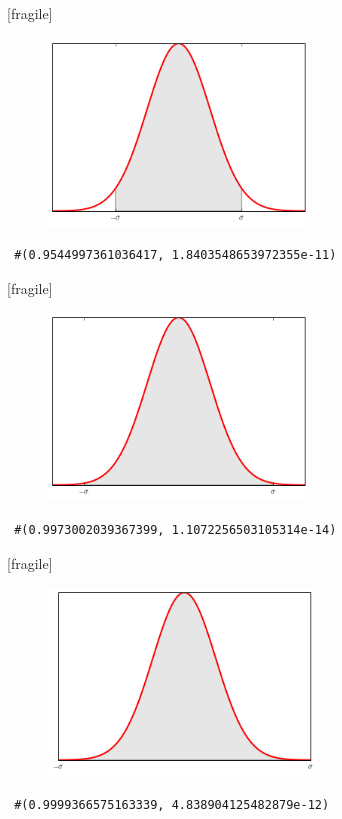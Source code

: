 [fragile]
 \begin{figure}
 \centering
 \includegraphics[height=5cm,keepaspectratio=true]{./pe/norm2.png}
 \label{fig:norm2}
\end{figure}
\begin{verbatim}
 #(0.9544997361036417, 1.8403548653972355e-11)
\end{verbatim}


[fragile]
 \begin{figure}
 \centering
 \includegraphics[height=5cm,keepaspectratio=true]{./pe/norm3.png}
 \label{fig:norm3}
\end{figure}
\begin{verbatim}
 #(0.9973002039367399, 1.1072256503105314e-14)
\end{verbatim}


[fragile]
 \begin{figure}
 \centering
 \includegraphics[height=5cm,keepaspectratio=true]{./pe/norm4.png}
 \label{fig:norm4}
\end{figure}
\begin{verbatim}
 #(0.9999366575163339, 4.838904125482879e-12)
\end{verbatim}


